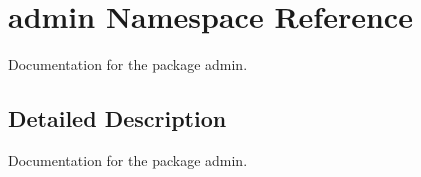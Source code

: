 \hypertarget{namespaceadmin}{}\section{admin Namespace Reference}
\label{namespaceadmin}


Documentation for the package admin.  




\subsection{Detailed Description}
Documentation for the package admin. 